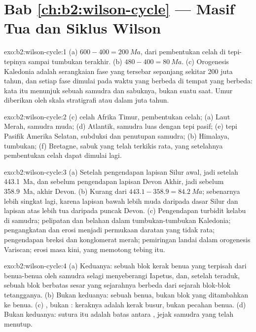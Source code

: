 \section*{Bab \ref{ch:b2:wilson-cycle} --- Masif Tua dan Siklus Wilson}

\begin{solution}{exo:b2:wilson-cycle:1}
(a) $600 - 400 = \qty{200}{Ma}$, dari pembentukan celah di tepi-tepinya sampai tumbukan terakhir.
(b) $480 - 400 = \qty{80}{Ma}$. (c) Orogenesis Kaledonia adalah serangkaian fase yang tersebar sepanjang
sekitar 200 juta tahun, dan setiap fase dimulai pada waktu yang berbeda di tempat yang berbeda: kata itu
menunjuk sebuah samudra dan sabuknya, bukan suatu saat. Umur diberikan oleh skala stratigrafi atau dalam
juta tahun.
\end{solution}

\begin{solution}{exo:b2:wilson-cycle:2}
(c) celah Afrika Timur, pembentukan celah; (a) Laut Merah, samudra muda; (d) Atlantik, samudra luas
dengan tepi pasif; (e) tepi Pasifik Amerika Selatan, subduksi dan
penutupan samudra; (b) Himalaya, tumbukan; (f) Bretagne, sabuk yang telah terkikis rata, yang setelahnya
pembentukan celah dapat dimulai lagi.
\end{solution}

\begin{solution}{exo:b2:wilson-cycle:3}
(a) Setelah pengendapan lapisan Silur awal, jadi setelah \qty{443.1}{Ma}, dan sebelum
pengendapan lapisan Devon Akhir, jadi sebelum \qty{358.9}{Ma}, akhir Devon.
(b) Kurang dari $443.1 - 358.9 = \qty{84.2}{Ma}$; sebenarnya lebih singkat lagi, karena lapisan bawah lebih muda
daripada dasar Silur dan lapisan atas lebih tua daripada puncak Devon. (c) Pengendapan
turbidit kelabu di samudra; pelipatan dan belahan dalam tumbukan-tumbukan Kaledonia; pengangkatan dan
erosi menjadi permukaan daratan yang tidak rata; pengendapan breksi dan konglomerat merah; pemiringan
landai dalam orogenesis Variscan; erosi masa kini, yang memotong tebing itu.
\end{solution}

\begin{solution}{exo:b2:wilson-cycle:4}
(a) Keduanya: sebuah blok kerak benua yang terpisah dari benua-benua oleh samudra selagi
menyeberangi Iapetus, dan, setelah teraduk, sebuah blok berbatas sesar yang sejarahnya berbeda dari sejarah
blok-blok tetangganya. (b) Bukan keduanya: sebuah benua, bukan blok yang ditambahkan ke benua. (c) , bukan
: keraknya adalah kerak busur, bukan pecahan benua. (d) Bukan keduanya: sutura itu adalah
batas antara , jejak samudra yang telah menutup.
\end{solution}

